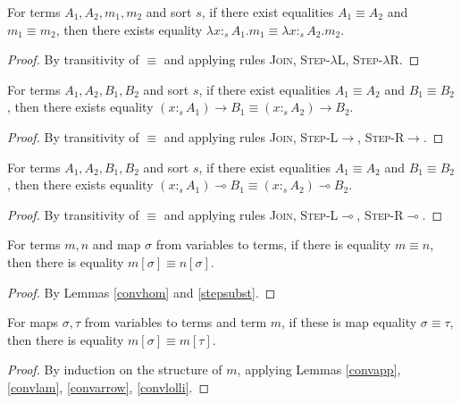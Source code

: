 \documentclass[sigplan,screen,review,anonymous]{acmart}
\newcommand{\rname}[1]{\textsc{\footnotesize #1}}
\newcommand{\stype}[1]{:_#1}
\begin{document}
\begin{lemma}\label{convlam}
  For terms $A_1, A_2, m_1, m_2$ and sort $s$, if there exist equalities $A_1 \equiv A_2$ and $m_1 \equiv m_2$, then there exists equality $\lambda x \stype{s} A_1.m_1 \equiv \lambda x \stype{s} A_2.m_2$.
\end{lemma}
\begin{proof}
  By transitivity of $\equiv$ and applying rules \rname{Join}, \rname{Step-$\lambda$L}, \rname{Step-$\lambda$R}.
\end{proof}

\begin{lemma}\label{convarrow}
  For terms $A_1, A_2, B_1, B_2$ and sort $s$, if there exist equalities $A_1 \equiv A_2$ and $B_1 \equiv B_2$, then there exists equality $(x \stype{s} A_1) \rightarrow B_1 \equiv (x \stype{s} A_2) \rightarrow B_2$.
\end{lemma}
\begin{proof}
  By transitivity of $\equiv$ and applying rules \rname{Join}, \rname{Step-L$\rightarrow$}, \rname{Step-R$\rightarrow$}.
\end{proof}

\begin{lemma}\label{convlolli}
  For terms $A_1, A_2, B_1, B_2$ and sort $s$, if there exist equalities $A_1 \equiv A_2$ and $B_1 \equiv B_2$, then there exists equality $(x \stype{s} A_1) \multimap B_1 \equiv (x \stype{s} A_2) \multimap B_2$.
\end{lemma}
\begin{proof}
  By transitivity of $\equiv$ and applying rules \rname{Join}, \rname{Step-L$\multimap$}, \rname{Step-R$\multimap$}.
\end{proof}

\begin{lemma}\label{convsubst}
  For terms $m, n$ and map $\sigma$ from variables to terms, if there is equality $m \equiv n$, then there is equality $m[\sigma] \equiv n[\sigma]$.
\end{lemma}
\begin{proof}
  By Lemmas \ref{convhom} and \ref{stepsubst}.
\end{proof}

\begin{lemma}\label{convcompat}
  For maps $\sigma, \tau$ from variables to terms and term $m$, if these is map equality $\sigma \equiv \tau$, then there is equality $m[\sigma] \equiv m[\tau]$.
\end{lemma}
\begin{proof}
  By induction on the structure of $m$, applying Lemmas \ref{convapp}, \ref{convlam}, \ref{convarrow}, \ref{convlolli}.
\end{proof}
\end{document}
